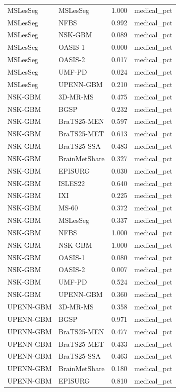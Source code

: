 \begin{tabular}{llrl}
MSLesSeg & MSLesSeg & 1.000 & medical\_pct \\
MSLesSeg & NFBS & 0.992 & medical\_pct \\
MSLesSeg & NSK-GBM & 0.089 & medical\_pct \\
MSLesSeg & OASIS-1 & 0.000 & medical\_pct \\
MSLesSeg & OASIS-2 & 0.017 & medical\_pct \\
MSLesSeg & UMF-PD & 0.024 & medical\_pct \\
MSLesSeg & UPENN-GBM & 0.210 & medical\_pct \\
NSK-GBM & 3D-MR-MS & 0.475 & medical\_pct \\
NSK-GBM & BGSP & 0.232 & medical\_pct \\
NSK-GBM & BraTS25-MEN & 0.597 & medical\_pct \\
NSK-GBM & BraTS25-MET & 0.613 & medical\_pct \\
NSK-GBM & BraTS25-SSA & 0.483 & medical\_pct \\
NSK-GBM & BrainMetShare & 0.327 & medical\_pct \\
NSK-GBM & EPISURG & 0.030 & medical\_pct \\
NSK-GBM & ISLES22 & 0.640 & medical\_pct \\
NSK-GBM & IXI & 0.225 & medical\_pct \\
NSK-GBM & MS-60 & 0.372 & medical\_pct \\
NSK-GBM & MSLesSeg & 0.337 & medical\_pct \\
NSK-GBM & NFBS & 1.000 & medical\_pct \\
NSK-GBM & NSK-GBM & 1.000 & medical\_pct \\
NSK-GBM & OASIS-1 & 0.080 & medical\_pct \\
NSK-GBM & OASIS-2 & 0.007 & medical\_pct \\
NSK-GBM & UMF-PD & 0.524 & medical\_pct \\
NSK-GBM & UPENN-GBM & 0.360 & medical\_pct \\
UPENN-GBM & 3D-MR-MS & 0.358 & medical\_pct \\
UPENN-GBM & BGSP & 0.971 & medical\_pct \\
UPENN-GBM & BraTS25-MEN & 0.477 & medical\_pct \\
UPENN-GBM & BraTS25-MET & 0.433 & medical\_pct \\
UPENN-GBM & BraTS25-SSA & 0.463 & medical\_pct \\
UPENN-GBM & BrainMetShare & 0.180 & medical\_pct \\
UPENN-GBM & EPISURG & 0.810 & medical\_pct \\

\end{tabular}

